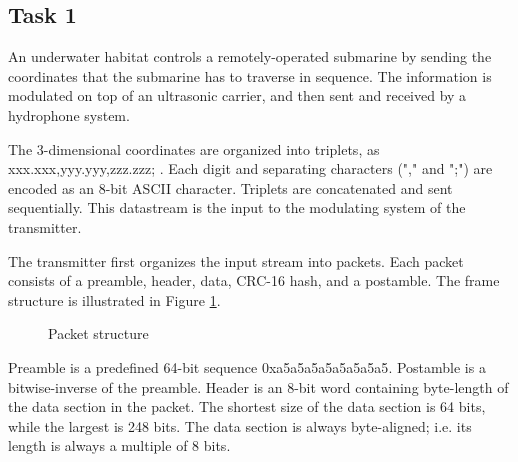 \documentclass{article}
\begin{document}
	\subsection{Task 1}
An underwater habitat controls a remotely-operated submarine by sending the coordinates that the submarine has to traverse in sequence. The information is modulated on top of an ultrasonic carrier, and then sent and received by a hydrophone system.

The 3-dimensional coordinates are organized into triplets, as \textsf{xxx.xxx,yyy.yyy,zzz.zzz;} . Each digit and separating characters ("\textsf{,}" and "\textsf{;}") are encoded as an 8-bit ASCII character. Triplets are concatenated and sent sequentially. This datastream is the input to the modulating system of the transmitter.

The transmitter first organizes the input stream into packets. Each packet consists of a preamble, header, data, CRC-16 hash, and a postamble. The frame structure is illustrated in Figure \ref{fig:packet}.

\begin{figure}[h!]
\centering
{}
\caption{Packet structure}
\label{fig:packet}
\end{figure}

Preamble is a predefined 64-bit sequence \textsf{0xa5a5a5a5a5a5a5a5}. Postamble is a bitwise-inverse of the preamble. Header is an 8-bit word containing byte-length of the data section in the packet. The shortest size of the data section is 64 bits, while the largest is 248 bits. The data section is always byte-aligned; i.e. its length is always a multiple of 8 bits.
\end{document}
